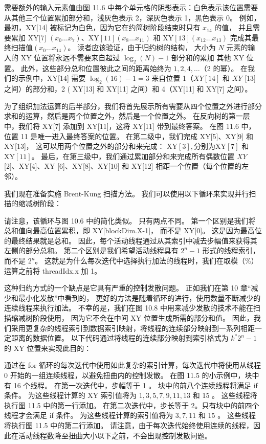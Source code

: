 需要额外的输入元素值由图 11.6 中每个单元格的阴影表示：白色表示该位置需要从其他三个位置累加部分和，浅灰色表示 2，深灰色表示 1，黑色表示 0。 
例如，最初，XY[14] 被标记为白色，因为它在约简树阶段结束时只有 $x_{14}$ 的值，
并且需要累加 XY[7] $\left(x_ {0} \ldots x_{7}\right)、\mathrm{XY}[11]\left(x_{8} \ldots x_{11}\right)$ 
和 $\mathrm{XY}[13]\left(x_{12} \ldots x_{13}\right)$ 
完成其最终扫描值$\left(x_{0} \ldots x_{14}\right)$。 
读者应该验证，由于归约树的结构，
大小为 $N$ 元素的输入的 XY 位置将永远不需要来自超过 $\log _{2}(N)-1$ 部分和的累加 其他 XY 位置。 
此外，这些部分总和位置彼此之间的距离始终为 $1,2,4, \ldots$（2 的幂）。 
在我们的示例中，XY[14] 需要 $\log _{2}(16)-1=3$ 来自位置 1（$X Y[14]$ 和 $X Y$ [13] 之间）的部分和，2 ( XY[13] 和 XY[11] 之间）和 4（XY[11] 和 XY[7] 之间）。

为了组织加法运算的后半部分，我们将首先展示所有需要从四个位置之外进行部分求和的运算，然后是两个位置之外，然后是一个位置之外。 
在反向树的第一层中，我们将 XY[7] 添加到 XY[11]，这将 XY[11] 带到最终答案。 
在图 11.6 中，位置 11 是唯一进入最终答案的位置。 
在第二级中，我们完成 XY[5]、XY[9] 和 XY[13]，
这可以用两个位置之外的部分和来完成： $\mathrm{XY}[3], \mathrm{ 分别为 XY}[7]$ 和 $\mathrm{XY}[11]$。 
最后，在第三级中，我们通过累加部分和来完成所有偶数位置 $X Y$ [2]、XY[4]、XY [6]、XY[8]、XY[10] 和 XY[12] 相距一个位置（每个位置的左邻）。

我们现在准备实施 Brent-Kung 扫描方法。 我们可以使用以下循环来实现并行扫描的缩减树阶段：

请注意，该循环与图 10.6 中的简化类似。 只有两点不同。 第一个区别是我们将总和值向最高位置累积，即 XY[blockDim.X-1]，
而不是 XY[0]。 这是因为最高位的最终结果就是总和。 因此，每个活动线程通过从其索引中减去步幅值来获得其左侧的部分总和。 
第二个区别是我们希望活动线程具有 $2^{n}-1$ 形式的线程索引，而不是 $2^{n}$。 
这就是为什么每次迭代中选择执行加法的线程时，我们在取模（\%）运算之前将 threadIdx.x 加 1。

这种归约方式的一个缺点是它具有严重的控制发散问题。 正如我们在第 10 章“减少和最小化发散”中看到的，
更好的方法是随着循环的进行，使用数量不断减少的连续线程来执行加法。 
不幸的是，我们在图 10.8 中用来减少发散的技术不能在扫描缩减树阶段使用，
因为它不会在中间 $\mathrm{XY}$ 位置生成所需的部分和值。 
因此，我们采用更复杂的线程索引到数据索引映射，将线程的连续部分映射到一系列相距一定距离的数据位置。 
以下代码通过将线程的连续部分映射到索引格式为 $k^{*} 2^{n}-1$ 的 XY 位置来实现此目的：

通过在 for 循环的每次迭代中使用如此复杂的索引计算，每次迭代中将使用从线程 0 开始的一组连续线程，以避免扭曲内的控制发散。 
在图 11.5 的小示例中，块中有 16 个线程。 在第一次迭代中，步幅等于 1 。 块中的前八个连续线程将满足 if 条件。 
为这些线程计算的 XY 索引值将为 $1,3,5,7,9,11,13$ 和 15 。 这些线程将执行图 11.5 中的第一行添加。 
在第二次迭代中，步长等于 2。只有块中的前四个线程才会满足 if 条件。 为这些线程计算的索引值将为 $3,7,11$ 和 15 。 
这些线程将执行图 11.5 中的第二行添加。 
请注意，由于每次迭代始终使用连续的线程，因此在活动线程数降至扭曲大小以下之前，不会出现控制发散问题。

